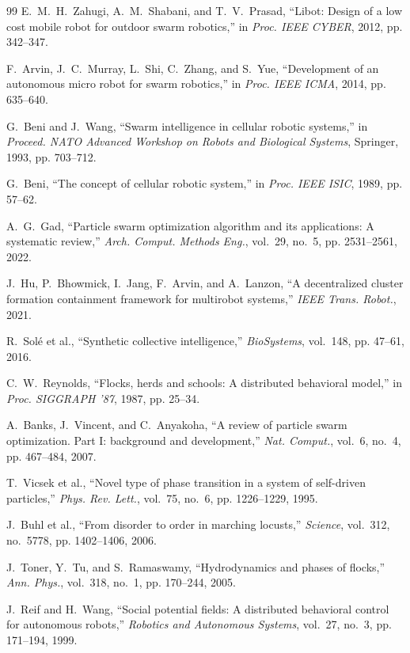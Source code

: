 \documentclass[letterpaper, 10pt, conference]{IEEEtran}
\begin{document}
\begin{thebibliography}{99}
E.~M.~H.~Zahugi, A.~M.~Shabani, and T.~V.~Prasad, ``Libot: Design of a low cost mobile robot for outdoor swarm robotics,'' in \emph{Proc. IEEE CYBER}, 2012, pp. 342--347.

F.~Arvin, J.~C.~Murray, L.~Shi, C.~Zhang, and S.~Yue, ``Development of an autonomous micro robot for swarm robotics,'' in \emph{Proc. IEEE ICMA}, 2014, pp. 635--640.

G.~Beni and J.~Wang, ``Swarm intelligence in cellular robotic systems,'' in \emph{Proceed. NATO Advanced Workshop on Robots and Biological Systems}, Springer, 1993, pp. 703--712.

G.~Beni, ``The concept of cellular robotic system,'' in \emph{Proc. IEEE ISIC}, 1989, pp. 57--62.

A.~G.~Gad, ``Particle swarm optimization algorithm and its applications: A systematic review,'' \emph{Arch. Comput. Methods Eng.}, vol.~29, no.~5, pp. 2531--2561, 2022.

J.~Hu, P.~Bhowmick, I.~Jang, F.~Arvin, and A.~Lanzon, ``A decentralized cluster formation containment framework for multirobot systems,'' \emph{IEEE Trans. Robot.}, 2021.

R.~Solé et al., ``Synthetic collective intelligence,'' \emph{BioSystems}, vol.~148, pp. 47--61, 2016.

C.~W.~Reynolds, ``Flocks, herds and schools: A distributed behavioral model,'' in \emph{Proc. SIGGRAPH '87}, 1987, pp. 25--34.

A.~Banks, J.~Vincent, and C.~Anyakoha, ``A review of particle swarm optimization. Part I: background and development,'' \emph{Nat. Comput.}, vol.~6, no.~4, pp. 467--484, 2007.

T.~Vicsek et al., ``Novel type of phase transition in a system of self-driven particles,'' \emph{Phys. Rev. Lett.}, vol.~75, no.~6, pp. 1226--1229, 1995.

J.~Buhl et al., ``From disorder to order in marching locusts,'' \emph{Science}, vol.~312, no.~5778, pp. 1402--1406, 2006.

J.~Toner, Y.~Tu, and S.~Ramaswamy, ``Hydrodynamics and phases of flocks,'' \emph{Ann. Phys.}, vol.~318, no.~1, pp. 170--244, 2005.

J.~Reif and H.~Wang, ``Social potential fields: A distributed behavioral control for autonomous robots,'' \emph{Robotics and Autonomous Systems}, vol.~27, no.~3, pp. 171--194, 1999.


\end{thebibliography}
\end{document}

